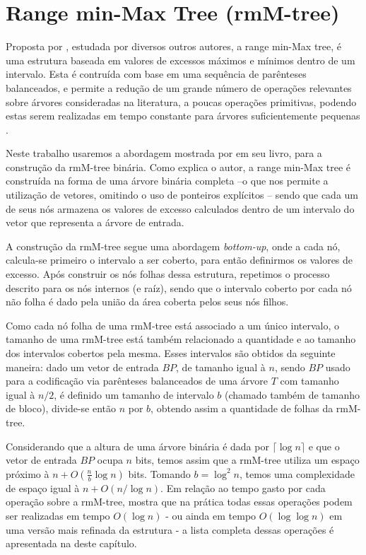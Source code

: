 \section{Range min-Max Tree (rmM-tree)}\label{sec:sec-classic-rmm-tree}
Proposta por \citet{paper-fully-functinal-succint-trees}, estudada por diversos outros autores, a range min-Max tree, é uma estrutura baseada em valores de excessos máximos e mínimos dentro de um intervalo. Esta é contruída com base em uma sequência de parênteses balanceados, e permite a redução de um grande número de operações relevantes sobre árvores consideradas na literatura, a poucas operações primitivas, podendo estas serem realizadas em tempo constante para árvores suficientemente pequenas \citep{paper-fully-functinal-succint-trees}.

Neste trabalho usaremos a abordagem mostrada por \citet{book-compact-data-structures} em seu livro, para a construção da rmM-tree binária. Como explica o autor, a range min-Max tree é construída na forma de uma árvore binária completa --o que nos permite a utilização de vetores, omitindo o uso de ponteiros explícitos -- sendo que cada um de seus nós armazena os valores de excesso calculados dentro de um intervalo do vetor que representa a árvore de entrada. 

A construção da rmM-tree segue uma abordagem \textit{bottom-up}, onde a cada nó, calcula-se primeiro o intervalo a ser coberto, para então definirmos os  valores de excesso. Após construir os nós folhas dessa estrutura, repetimos o processo descrito para os nós internos (e raíz), sendo que o intervalo coberto por cada nó não folha é dado pela união da área coberta pelos seus nós filhos.

Como cada nó folha de uma rmM-tree está associado a um único intervalo, o tamanho de uma rmM-tree está também relacionado a quantidade e ao tamanho dos intervalos cobertos pela mesma. 
Esses intervalos são obtidos da seguinte maneira: dado um vetor de entrada $BP$, de  tamanho igual à $n$, sendo $BP$ usado para a codificação via parênteses balanceados de uma árvore $T$ com tamanho igual à $n/2$, é definido um tamanho de intervalo $b$ (chamado também de tamanho de bloco), divide-se então $n$ por $b$, obtendo assim a quantidade de folhas da rmM-tree.

Considerando que a altura de uma árvore binária é dada por $\lceil \log n \rceil$ e que o vetor de entrada $BP$ ocupa $n$ bits, temos assim que a rmM-tree utiliza um espaço próximo à $n + O(\frac{n}{b} \log n)$ bits. Tomando $b = \log^2 n$, temos uma complexidade de espaço igual à $n + O(n/\log n)$. Em relação ao tempo gasto por cada operação sobre a rmM-tree,  \citet{book-compact-data-structures} mostra que na prática todas essas operações podem ser realizadas em tempo $O(\log n)$ - ou ainda em tempo $O(\log \log n)$ em uma versão mais refinada da estrutura - a lista completa dessas operações é apresentada na  deste capítulo.

